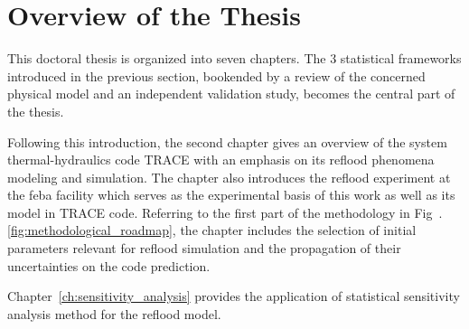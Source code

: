 \section{Overview of the Thesis}\label{sec:intro_overview}

This doctoral thesis is organized into seven chapters.
The $3$ statistical frameworks introduced in the previous section, 
bookended by a review of the concerned physical model and an independent validation study, 
becomes the central part of the thesis.

Following this introduction, 
the second chapter gives an overview of the system thermal-hydraulics code TRACE with an emphasis on its reflood phenomena modeling and simulation.
The chapter also introduces the reflood experiment at the \gls{feba} facility which serves as the experimental basis of this work
as well as its model in TRACE code.
Referring to the first part of the methodology in Fig~.\ref{fig:methodological_roadmap}, 
the chapter includes the selection of initial parameters relevant for reflood simulation and the propagation of their uncertainties on the code prediction.

Chapter~\ref{ch:sensitivity_analysis} provides the application of statistical sensitivity analysis method for the reflood model.
